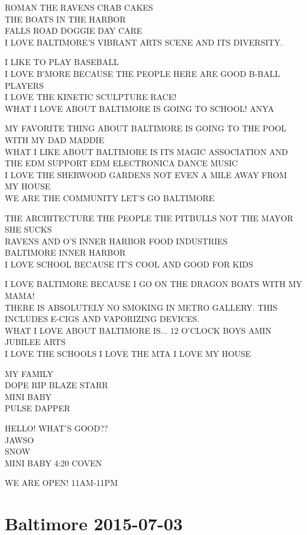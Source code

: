 \documentclass[10pt,letterpaper]{article}
\begin{document}
ROMAN THE RAVENS CRAB CAKES\\
THE BOATS IN THE HARBOR\\
FALLS ROAD DOGGIE DAY CARE\\
I LOVE BALTIMORE'S VIBRANT ARTS SCENE AND ITS DIVERSITY.

I LIKE TO PLAY BASEBALL\\
I LOVE B'MORE BECAUSE THE PEOPLE HERE ARE GOOD B{-}BALL PLAYERS\\
I LOVE THE KINETIC SCULPTURE RACE!\\
WHAT I LOVE ABOUT BALTIMORE IS GOING TO SCHOOL!  ANYA

MY FAVORITE THING ABOUT BALTIMORE IS GOING TO THE POOL WITH MY DAD MADDIE\\
WHAT I LIKE ABOUT BALTIMORE IS ITS MAGIC ASSOCIATION AND THE EDM SUPPORT EDM ELECTRONICA DANCE MUSIC\\
I LOVE THE SHERWOOD GARDENS NOT EVEN A MILE AWAY FROM MY HOUSE\\
WE ARE THE COMMUNITY LET'S GO BALTIMORE

THE ARCHITECTURE THE PEOPLE THE PITBULLS NOT THE MAYOR SHE SUCKS\\
RAVENS AND O'S INNER HARBOR FOOD INDUSTRIES\\
BALTIMORE INNER HARBOR\\
I LOVE SCHOOL BECAUSE IT'S COOL AND GOOD FOR KIDS

I LOVE BALTIMORE BECAUSE I GO ON THE DRAGON BOATS WITH MY MAMA!\\
THERE IS ABSOLUTELY NO SMOKING IN METRO GALLERY.  THIS INCLUDES E{-}CIGS AND VAPORIZING DEVICES.\\
WHAT I LOVE ABOUT BALTIMORE IS... 12 O'CLOCK BOYS AMIN JUBILEE ARTS\\
I LOVE THE SCHOOLS I LOVE THE MTA I LOVE MY HOUSE

MY FAMILY\\
DOPE RIP BLAZE STARR\\
MINI BABY\\
PULSE DAPPER

HELLO!  WHAT'S GOOD??\\
JAWSO\\
SNOW\\
MINI BABY 4:20 COVEN

WE ARE OPEN!  11AM{-}11PM


\section*{Baltimore 2015-07-03}
\end{document}
